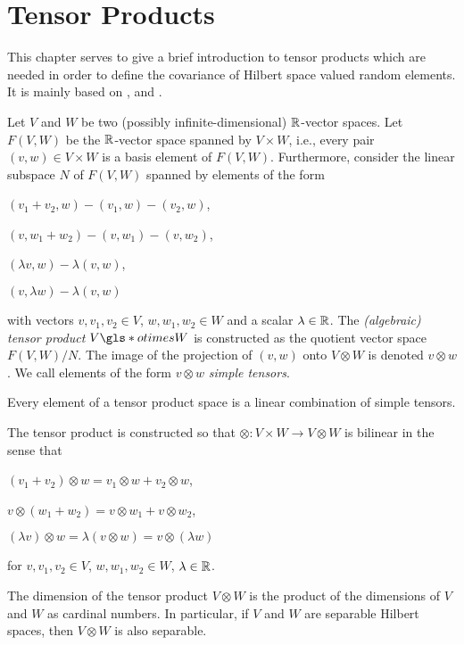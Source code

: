 \chapter{Tensor Products} \label{appendix:tensorproduct}

This chapter serves to give a brief introduction to tensor products which are needed in order to define the covariance of Hilbert space valued random elements. It is mainly based on \cite{ryan2002banach}, \cite{kadisonringrose1997fundamentalsofoperatoralgebras} and \cite{weidmann1980linear}.

\begin{defn}
    Let $V$ and $W$ be two (possibly infinite-dimensional) $\mathbb{R}$-vector spaces. Let $F(V, W)$ be the $\mathbb{R}$-vector space spanned by $V \times W$, i.e., every pair $(v, w) \in V \times W$ is a basis element of $F(V, W)$. Furthermore, consider the linear subspace $N$ of $F(V, W)$ spanned by elements of the form
    \begin{aufzii}
        \item $(v_1 + v_2, w) - (v_1, w) - (v_2, w)$,
        \item $(v, w_1 + w_2) - (v, w_1) - (v, w_2)$,
        \item $(\lambda v, w) - \lambda (v, w)$,
        \item $(v, \lambda w) - \lambda (v, w)$
    \end{aufzii}
    with vectors $v, v_1, v_2 \in V$, $w, w_1, w_2 \in W$ and a scalar $\lambda \in \mathbb{R}$. The \textit{(algebraic) tensor product} $V \gls*{otimes} W$ is constructed as the quotient vector space $F(V, W) / N$. The image of the projection of $(v, w)$ onto $V \otimes W$ is denoted $v \otimes w$. We call elements of the form $v \otimes w$ \textit{simple tensors}.
\end{defn}

\begin{remark}
    \begin{aufzi}
        \item Every element of a tensor product space is a linear combination of simple tensors.
        \item The tensor product is constructed so that $\otimes: V \times W \to V \otimes W$ is bilinear in the sense that
        \begin{aufzii}
            \item $(v_1 + v_2) \otimes w = v_1 \otimes w + v_2 \otimes w$,
            \item $v \otimes (w_1 + w_2) = v \otimes w_1 + v \otimes w_2$,
            \item $(\lambda v) \otimes w = \lambda (v \otimes w) = v \otimes (\lambda w)$
        \end{aufzii}
        for $v, v_1, v_2 \in V$, $w, w_1, w_2 \in W$, $\lambda \in \mathbb{R}$.
        \item The dimension of the tensor product $V \otimes W$ is the product of the dimensions of $V$ and $W$ as cardinal numbers. In particular, if $V$ and $W$ are separable Hilbert spaces, then $V \otimes W$ is also separable.
    \end{aufzi}
\end{remark}

